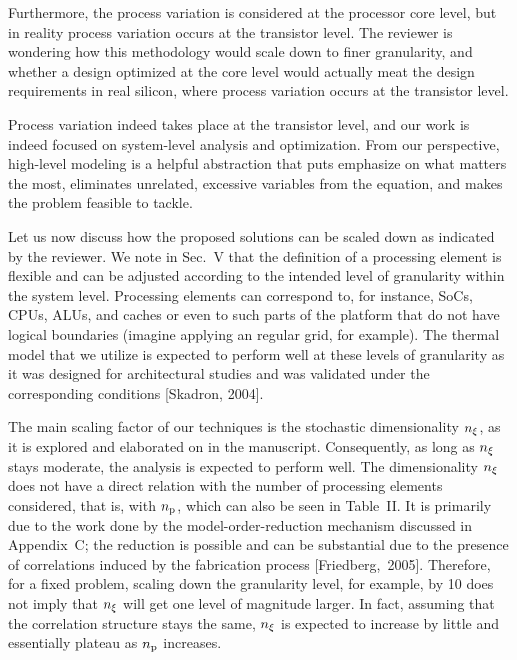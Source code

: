 \begin{reviewer}
Furthermore, the process variation is considered at the processor core level,
but in reality process variation occurs at the transistor level. The reviewer
is wondering how this methodology would scale down to finer granularity, and
whether a design optimized at the core level would actually meat the design
requirements in real silicon, where process variation occurs at the transistor
level.
\end{reviewer}

\begin{authors}
Process variation indeed takes place at the transistor level, and our work is
indeed focused on system-level analysis and optimization. From our perspective,
high-level modeling is a helpful abstraction that puts emphasize on what matters
the most, eliminates unrelated, excessive variables from the equation, and makes
the problem feasible to tackle.

Let us now discuss how the proposed solutions can be scaled down as indicated by
the reviewer. We note in Sec.~V that the definition of a processing element is
flexible and can be adjusted according to the intended level of granularity
within the system level. Processing elements can correspond to, for instance,
SoCs, CPUs, ALUs, and caches or even to such parts of the platform that do not
have logical boundaries (imagine applying an regular grid, for example). The
thermal model that we utilize is expected to perform well at these levels of
granularity as it was designed for architectural studies and was validated under
the corresponding conditions [Skadron, 2004].

The main scaling factor of our techniques is the stochastic dimensionality
${n_\xi}$, as it is explored and elaborated on in the manuscript. Consequently,
as long as ${n_\xi}$ stays moderate, the analysis is expected to perform well.
The dimensionality ${n_\xi}$ does not have a direct relation with the number of
processing elements considered, that is, with ${n_\text{p}}$, which can also be seen in
Table~II. It is primarily due to the work done by the model-order-reduction
mechanism discussed in Appendix~C; the reduction is possible and can be
substantial due to the presence of correlations induced by the fabrication
process [Friedberg,~2005]. Therefore, for a fixed problem, scaling down the
granularity level, for example, by 10 does not imply that ${n_\xi}$ will get one
level of magnitude larger. In fact, assuming that the correlation structure
stays the same, ${n_\xi}$ is expected to increase by little and essentially
plateau as ${n_\text{p}}$ increases.


\end{authors}
